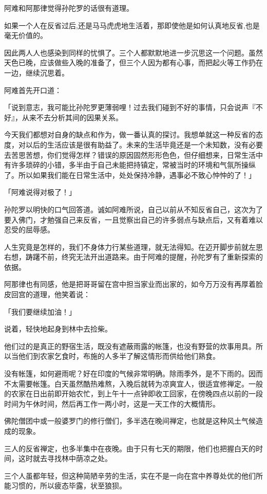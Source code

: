 \documentclass[twoside,openany]{book}
\begin{document}
阿难和阿那律觉得孙陀罗的话很有道理。

如果一个人在反省过后,还是马马虎虎地生活着，那即使他是如何认真地反省,也是毫无价值的。

因此两人人也感染到同样的忧惧了。三个人都默默地进一步沉思这一个问题。虽然天色已晚，应该做些入晚的准备了，但三个人因为都有心事，而把起火等工作扔在一边，继续沉思着。

阿难首先开口道：

「说到意志，我可能比孙陀罗更薄弱哩！过去我们碰到不好的事情，只会说声『不好』，从来不去分析其间的因果关系。

今天我们都想对自身的缺点和作为，做一番认真的探讨。我想单就这一种反省的态度，对以后的生活应该是很有助益了。未来的生活毕竟还是一个未知数，没有必要去苦思苦想，你们觉得怎样？错误的原因固然形形色色，但仔细想来，日常生活中有许多琐碎的小错，多半由于自己未能把持镇定，常被当时的环境和气氛所操纵了。所以如果我们能在日常生活中，处处保持冷静，遇事必不致心忡忡的了！」

「阿难说得对极了！」

孙陀罗以明快的口气回答道。诚如阿难所说，自己以前从不知反省自己，这次为了要入佛门，才勉强自己来反省，一且觉察出自己的许多弱点与缺点后，又有着难以忍受的屈辱感。

人生究竟是怎样的，我们不身体力行某些道理，就无法得知。在迈开脚步前就左思右想，踌躇不前，终究无法开出道路来。由于阿难的提醒，孙陀罗有了重新探索的依据。

阿那律也有同感，他是把哥哥留在宫中担当家业而出家的，如今万万没有再厚着脸皮回宫的道理，他笑着说：

「我们要继续加油！」

说着，轻快地起身到林中去捡柴。

他们过的是真正的野宿生活，既没有遮蔽雨露的帐篷，也没有野营的炊事用具。所以当他们到农家乞食时，布施的人多半了解这情形而供给他们熟食。

没有帐篷，如何避雨呢？好在印度的气候非常明确。除雨季外，是不下雨的。因而不太需要帐篷。白天虽然酷热难熬，入晚后就转为凉爽宜人，很适宜修禅定。一般的农家在日出前即开始农忙，到上午十一点钟即收工回家，在傍晚四点以前的一段时间为午休时间，然后再工作一两小时，这是一天工作的大概情形。

佛陀僧团中或一般婆罗门的修行僧们，多半选在晚间禅定，也就是这种风土气候造成的现象。

三人的反省禅定，也多半集中在夜晚。由于只有七天的期限，他们也把握白天的时间，这时就去寻找林中荫凉之处。

三个人虽都年轻，但这种简陋辛劳的生活，实在不是一向在宫中养尊处优的他们所能习惯的，所以疲态毕露，状至狼狈。
\end{document}
